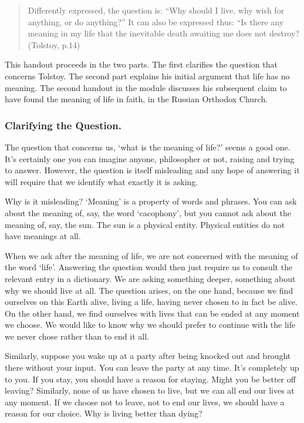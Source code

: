 \documentclass[10pt]{article}
\begin{document}
\begin{quote}
Differently expressed, the question is: ``Why should I live, why wish
for anything, or do anything?'' It can also be expressed thus: ``Is
there any meaning in my life that the inevitable death awaiting me does
not destroy? (Tolstoy, p.14)
\end{quote}

This handout proceeds in the two parts. The first clarifies the question
that concerns Tolstoy. The second part explains his initial argument
that life has no meaning. The second handout in the module discusses
his subsequent claim to have found the meaning of life in faith, in the
Russian Orthodox Church.

\subsubsection{Clarifying the Question.}\label{clarifying-the-question.}

The question that concerns us, `what is the meaning of life?' seems a
good one. It's certainly one you can imagine anyone, philosopher or not,
raising and trying to answer. However, the question is itself misleading
and any hope of answering it will require that we identify what exactly
it is asking.

Why is it misleading? `Meaning' is a property of words and phrases. You
can ask about the meaning of, say, the word `cacophony', but you cannot
ask about the meaning of, say, the sun. The sun is a physical entity.
Physical entities do not have meanings at all.

When we ask after the meaning of life, we are not concerned with the
meaning of the word `life'. Answering the question would then just
require us to consult the relevant entry in a dictionary. We are asking
something deeper, something about why we should live at all. The
question arises, on the one hand, because we find ourselves on this
Earth alive, living a life, having never chosen to in fact be alive. On
the other hand, we find ourselves with lives that can be ended at any
moment we choose. We would like to know why we should prefer to continue
with the life we never chose rather than to end it all.

Similarly, suppose you wake up at a party after being knocked out and
brought there without your input. You can leave the party at any time.
It's completely up to you. If you stay, you should have a reason for
staying. Might you be better off leaving? Similarly, none of us have
chosen to live, but we can all end our lives at any moment. If we choose
not to leave, not to end our lives, we should have a reason for our
choice. Why is living better than dying?
\end{document}
